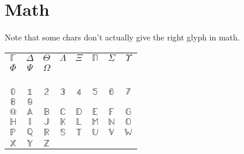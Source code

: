 \documentclass{article}
\begin{document}
\section{Math}
Note that some chars don't actually give the right glyph in math.

\begin{tabular}{cccccccc}
$\mathbb{\Gamma}$ & $\mathbb{\Delta}$   & $\mathbb{\Theta}$ & $\mathbb{\Lambda}$ &
$\mathbb{\Xi}$    & $\mathbb{\Pi}$      & $\mathbb{\Sigma}$ & $\mathbb{\Upsilon}$ \\
$\mathbb{\Phi}$   & $\mathbb{\Psi}$     & $\mathbb{\Omega}$ &                &
                  &                     &                   &                \\
                  &                     &                   &                &
                  &                     &                   &                \\
                  &                     &                   &                &
                  &                     &                   &                \\
                  &                     &                   &                &
                  &                     &                   &                \\
                  &                     &                   &                &
                  &                     &                   &                \\
$\mathbb{0}$      & $\mathbb{1}$        & $\mathbb{2}$      & $\mathbb{3}$ &
$\mathbb{4}$      & $\mathbb{5}$        & $\mathbb{6}$      & $\mathbb{7}$ \\
$\mathbb{8}$      & $\mathbb{9}$        &                   &              &
                  &                     &                   &              \\
$\mathbb{@}$      & $\mathbb{A}$        & $\mathbb{B}$      & $\mathbb{C}$ &
$\mathbb{D}$      & $\mathbb{E}$        & $\mathbb{F}$      & $\mathbb{G}$ \\
$\mathbb{H}$      & $\mathbb{I}$        & $\mathbb{J}$      & $\mathbb{K}$ &
$\mathbb{L}$      & $\mathbb{M}$        & $\mathbb{N}$      & $\mathbb{O}$ \\
$\mathbb{P}$      & $\mathbb{Q}$        & $\mathbb{R}$      & $\mathbb{S}$ &
$\mathbb{T}$      & $\mathbb{U}$        & $\mathbb{V}$      & $\mathbb{W}$ \\
$\mathbb{X}$      & $\mathbb{Y}$        & $\mathbb{Z}$      &              &

\end{tabular}
\end{document}
